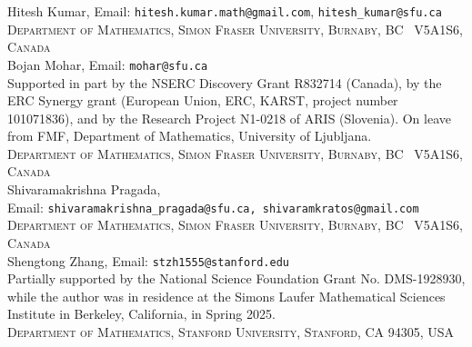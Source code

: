 \documentclass{article}
\begin{document}
\noindent Hitesh Kumar, Email: {\tt hitesh.kumar.math@gmail.com}, {\tt hitesh\_kumar@sfu.ca}\\
\textsc{Department of Mathematics, Simon Fraser University, Burnaby, BC \ V5A1S6, Canada}\\[1pt]

\noindent Bojan Mohar, Email: {\tt mohar@sfu.ca}\\
Supported in part by the NSERC Discovery Grant R832714 (Canada), by the ERC Synergy grant (European Union, ERC, KARST, project number 101071836), and by the Research Project N1-0218 of ARIS (Slovenia). On leave from FMF, Department of Mathematics, University of Ljubljana.\\
\textsc{Department of Mathematics, Simon Fraser University, Burnaby, BC \ V5A1S6, Canada}\\[1pt]

\noindent Shivaramakrishna Pragada,\\
Email: {\tt shivaramakrishna\_pragada@sfu.ca, shivaramkratos@gmail.com}\\
\textsc{Department of Mathematics, Simon Fraser University, Burnaby, BC \ V5A1S6, Canada}\\[1pt]

\noindent Shengtong Zhang, Email: {\tt stzh1555@stanford.edu}\\
Partially supported by the National Science Foundation Grant No. DMS-1928930, while the author was in residence at the Simons Laufer Mathematical Sciences Institute in Berkeley, California, in Spring 2025.\\
\textsc{Department of Mathematics, Stanford University, Stanford, CA 94305, USA}
\end{document}
